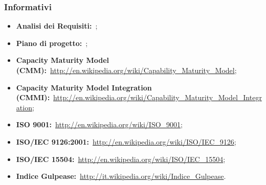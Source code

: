 	\subsubsection{Informativi}
	\begin{itemize}
		\item \textbf{Analisi dei Requisiti:}\ \ARdoc;
		\item \textbf{Piano di progetto:}\ \PPdoc;
		\item \textbf{Capacity Maturity Model (CMM):}\ \url{http://en.wikipedia.org/wiki/Capability_Maturity_Model};
		\item \textbf{Capacity Maturity Model Integration (CMMI):}\ \url{http://en.wikipedia.org/wiki/Capability_Maturity_Model_Integration};
		\item \textbf{ISO 9001:}\ \url{http://en.wikipedia.org/wiki/ISO_9001};
		\item \textbf{ISO/IEC 9126:2001:}\ \url{http://en.wikipedia.org/wiki/ISO/IEC_9126};
		\item \textbf{ISO/IEC 15504:}\ \url{http://en.wikipedia.org/wiki/ISO/IEC_15504};
		\item \textbf{Indice Gulpease:}\ \url{http://it.wikipedia.org/wiki/Indice_Gulpease}.
	\end{itemize}
	


			
			